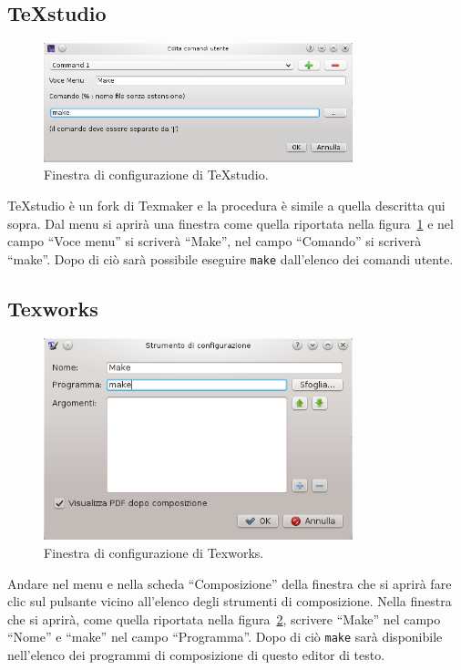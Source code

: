 \subsection{TeXstudio}
\label{sec:texstudio}

\begin{figure}
  \centering
  \includegraphics[width=0.8\textwidth]{figure/texstudio}
  \caption{Finestra di configurazione di TeXstudio.}
  \label{fig:texstudio}
\end{figure}
TeXstudio è un fork di Texmaker e la procedura è simile a quella descritta qui
sopra.  Dal menu  si aprirà
una finestra come quella riportata nella figura~\ref{fig:texstudio} e nel campo
``Voce menu'' si scriverà ``Make'', nel campo ``Comando'' si scriverà ``make''.
Dopo di ciò sarà possibile eseguire \texttt{make} dall'elenco dei comandi
utente.

\subsection{Texworks}
\label{sec:texworks}

\begin{figure}
  \centering
  \includegraphics[width=0.8\textwidth]{figure/texworks}
  \caption{Finestra di configurazione di Texworks.}
  \label{fig:texworks}
\end{figure}
Andare nel menu  e nella scheda ``Composizione''
della finestra che si aprirà fare clic sul pulsante \keys{{+}} vicino all'elenco
degli strumenti di composizione.  Nella finestra che si aprirà, come quella
riportata nella figura~\ref{fig:texworks}, scrivere ``Make'' nel campo ``Nome''
e ``make'' nel campo ``Programma''.  Dopo di ciò \texttt{make} sarà disponibile
nell'elenco dei programmi di composizione di questo editor di testo.

